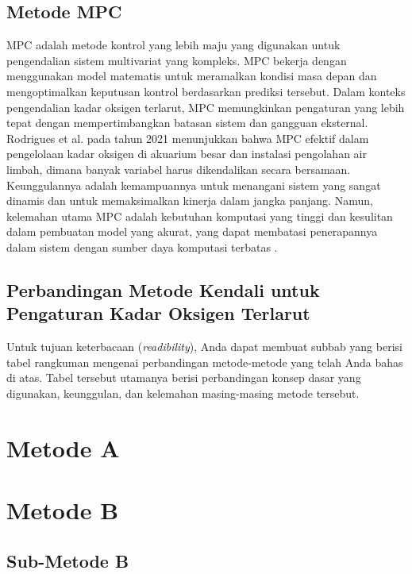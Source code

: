     \subsection{Metode MPC}
    \label{Metode_MPC}

    MPC adalah metode kontrol yang lebih maju yang digunakan untuk pengendalian sistem multivariat yang kompleks. MPC bekerja dengan menggunakan model matematis untuk meramalkan kondisi masa depan dan mengoptimalkan keputusan kontrol berdasarkan prediksi tersebut. Dalam konteks pengendalian kadar oksigen terlarut, MPC memungkinkan pengaturan yang lebih tepat dengan mempertimbangkan batasan sistem dan gangguan eksternal. Rodrigues et al. pada tahun 2021 \cite{rodrigues_mpc_2021} menunjukkan bahwa MPC efektif dalam pengelolaan kadar oksigen di akuarium besar dan instalasi pengolahan air limbah, dimana banyak variabel harus dikendalikan secara bersamaan. Keunggulannya adalah kemampuannya untuk menangani sistem yang sangat dinamis dan untuk memaksimalkan kinerja dalam jangka panjang. Namun, kelemahan utama MPC adalah kebutuhan komputasi yang tinggi dan kesulitan dalam pembuatan model yang akurat, yang dapat membatasi penerapannya dalam sistem dengan sumber daya komputasi terbatas \cite{taylor_mpc_2020}.

    \subsection{Perbandingan Metode Kendali untuk Pengaturan Kadar Oksigen Terlarut}
    Untuk tujuan keterbacaan (\textit{readibility}), Anda dapat membuat subbab yang berisi tabel rangkuman mengenai perbandingan metode-metode yang telah Anda bahas di atas. Tabel tersebut utamanya berisi perbandingan konsep dasar yang digunakan, keunggulan, dan kelemahan masing-masing metode tersebut.

\section{Metode A}
\label{sec:Metode_01}

    \lipsum[1-3]

\section{Metode B}
\label{sec:Metode_02}

    \lipsum[4-6]
    
    \subsection{Sub-Metode B}
    \label{subsec:Sub-Metode_02}
    
